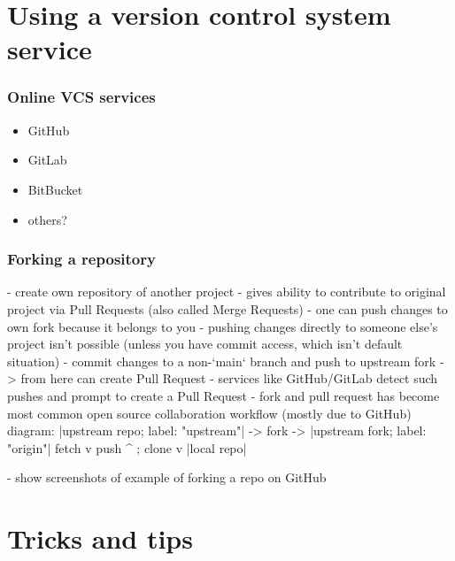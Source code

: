 \documentclass{git_course}
\begin{document}
\section{Using a version control system service}

\begin{frame}
    \frametitle{Online VCS services}
    \begin{itemize}
        \item GitHub
        \item GitLab
        \item BitBucket
        \item others?
    \end{itemize}
\end{frame}

\begin{frame}
    \frametitle{Forking a repository}

    - create own repository of another project
    - gives ability to contribute to original project via Pull Requests
    (also called Merge Requests)
    - one can push changes to own fork because it belongs to you
    - pushing changes directly to someone else's project isn't possible
    (unless you have commit access, which isn't default situation)
    - commit changes to a non-`main` branch and push to upstream fork ->
    from here can create Pull Request
    - services like GitHub/GitLab detect such pushes and prompt to create a
    Pull Request
    - fork and pull request has become most common open source collaboration
    workflow (mostly due to GitHub)
    diagram:
    |upstream repo; label: "upstream"|  -> fork -> |upstream fork; label: "origin"|
                        fetch v                            push ^ ; clone v
                                                   |local repo|

    - show screenshots of example of forking a repo on GitHub
\end{frame}


\section{Tricks and tips}
\end{document}
